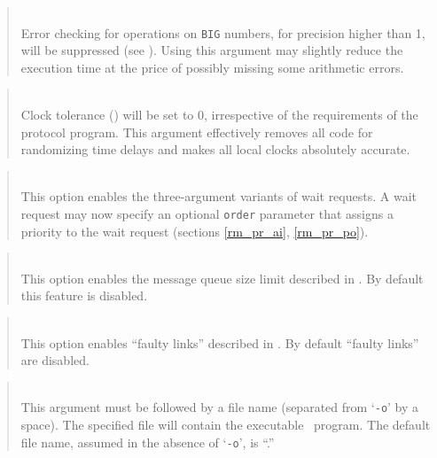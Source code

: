 \begin{quote}
\noindent{}\\ \hspace{0in}
Error checking for operations on {\tt BIG} numbers, for
precision higher than 1, will be suppressed (see ).
Using this argument may slightly reduce the execution time at the price
of possibly missing some arithmetic errors.
\end{quote}

\begin{quote}
\noindent{}\\ \hspace{0in}
Clock tolerance ()
will be set to 0, irrespective of the requirements of the
protocol program.
This argument effectively removes all code for randomizing time delays and
makes all local clocks absolutely accurate.
\end{quote}

\begin{quote}
\noindent{}\\ \hspace{0in}
This option enables the three-argument variants of wait requests.
A wait request may now specify an optional {\tt order} parameter that
assigns a priority to the wait request (sections \ref{rm_pr_ai},
\ref{rm_pr_po}).
\end{quote}

\begin{quote}
\noindent{}\\ \hspace{0in}
This option enables the message queue size limit described in
.
By default this feature is disabled.
\end{quote}

\begin{quote}
\noindent{}\\ \hspace{0in}
This option enables ``faulty links'' described in .
By default ``faulty links'' are disabled.
\end{quote}

\begin{quote}
\noindent{}\\ \hspace{0in}
This argument must be followed by a file name (separated from `{\tt -o}' by
a space).
The specified file will contain the executable \smurph\ program.
The default file name, assumed in the absence of `{\tt -o}',
is ``\smurphtts.''
\end{quote}

